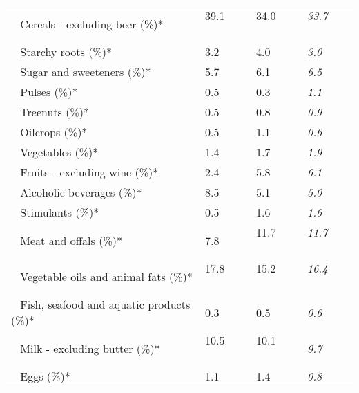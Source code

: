 \begin{tabular}{L{3.9cm} R{1cm} R{1cm} R{1cm}}
	 ~ Cereals - excluding beer (\%)* & 39.1 ~ \ \ & 34.0 ~ \ \ & \textit{33.7} ~ \ \ \\ 
	 ~ Starchy roots (\%)* & 3.2 ~ \ \ & 4.0 ~ \ \ & \textit{3.0} ~ \ \ \\ 
	 ~ Sugar and sweeteners (\%)* & 5.7 ~ \ \ & 6.1 ~ \ \ & \textit{6.5} ~ \ \ \\ 
	 ~ Pulses (\%)* & 0.5 ~ \ \ & 0.3 ~ \ \ & \textit{1.1} ~ \ \ \\ 
	 ~ Treenuts (\%)* & 0.5 ~ \ \ & 0.8 ~ \ \ & \textit{0.9} ~ \ \ \\ 
	 ~ Oilcrops (\%)* & 0.5 ~ \ \ & 1.1 ~ \ \ & \textit{0.6} ~ \ \ \\ 
	 ~ Vegetables (\%)* & 1.4 ~ \ \ & 1.7 ~ \ \ & \textit{1.9} ~ \ \ \\ 
	 ~ Fruits - excluding wine (\%)* & 2.4 ~ \ \ & 5.8 ~ \ \ & \textit{6.1} ~ \ \ \\ 
	 ~ Alcoholic beverages (\%)* & 8.5 ~ \ \ & 5.1 ~ \ \ & \textit{5.0} ~ \ \ \\ 
	 ~ Stimulants (\%)* & 0.5 ~ \ \ & 1.6 ~ \ \ & \textit{1.6} ~ \ \ \\ 
	 ~ Meat and offals (\%)* & 7.8 ~ \ \ & 11.7 ~ \ \ & \textit{11.7} ~ \ \ \\ 
	 ~ Vegetable oils and animal fats (\%)* & 17.8 ~ \ \ & 15.2 ~ \ \ & \textit{16.4} ~ \ \ \\ 
	 ~ Fish, seafood and aquatic products (\%)* & 0.3 ~ \ \ & 0.5 ~ \ \ & \textit{0.6} ~ \ \ \\ 
	 ~ Milk - excluding butter (\%)* & 10.5 ~ \ \ & 10.1 ~ \ \ & \textit{9.7} ~ \ \ \\ 
	 ~ Eggs (\%)* & 1.1 ~ \ \ & 1.4 ~ \ \ & \textit{0.8} ~ \ \ \\ 
       \toprule
      \end{tabular}
      \clearpage
{}
